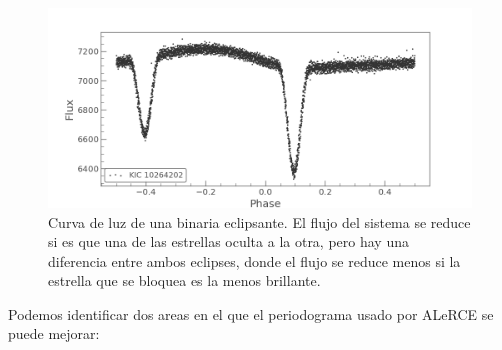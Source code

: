 \begin{figure}[H]
    \centering
    \includegraphics[scale=0.5]{lightcurve.png}
    \caption{Curva de luz de una binaria eclipsante. El flujo del sistema se reduce si es que una de las estrellas oculta a la otra, pero hay una diferencia entre ambos eclipses, donde el flujo se reduce menos si la estrella que se bloquea es la menos brillante.}
    \label{fig:eclipsantes}
\end{figure}
Podemos identificar dos areas en el que el periodograma usado por ALeRCE se puede mejorar:
